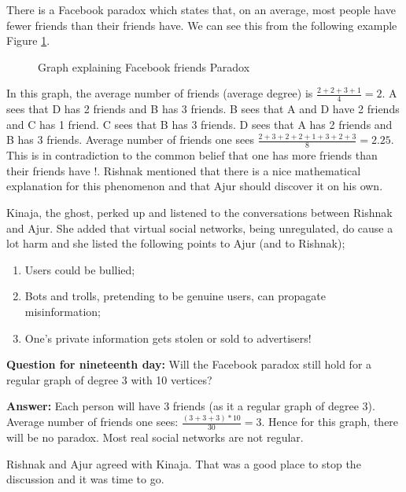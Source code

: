  There is a Facebook paradox which states that, on an average, most people have fewer friends than their friends have. We can see this from the following example Figure \ref{21g1}.
 \begin{figure}
\begin{center}
\caption{ Graph explaining Facebook friends Paradox}\label{21g1}
\end{center}
\end{figure}

In this graph, the average number of friends (average degree) is $\frac{2+2+3+1}{4}=2$.  A sees that D has 2 friends and B has 3 friends. B sees that A and D have 2 friends and C has 1 friend. C sees that B has 3 friends. D sees that A has 2 friends and B has 3 friends. Average number of friends one sees 
$\frac{2+3+2+2+1+3+2+3}{8}=2.25$. This is in contradiction to the common belief that one has more friends than their friends have !. Rishnak mentioned that there is a nice mathematical explanation for this phenomenon and that Ajur should discover it on his own.

Kinaja, the ghost, perked up and listened to the conversations between Rishnak and Ajur. She added that virtual social networks, being unregulated, do cause a lot harm and she listed the following points to Ajur (and to Rishnak);
\begin{enumerate}
    \item Users could be bullied;
    \item  Bots and trolls, pretending to be genuine users,  can propagate misinformation;
    \item  One's private information gets stolen or sold to advertisers!
\end{enumerate}


\textbf{Question for nineteenth day:} Will the Facebook paradox still hold for a regular graph of degree 3 with 10 vertices?

\textbf{Answer:} Each person will have 3 friends (as it a regular graph of degree 3).  Average number of friends one sees: $\frac{(3+3+3)*10}{30}=3$. Hence for this graph, there will be no paradox. Most real social networks are not regular.

Rishnak and Ajur agreed with Kinaja. That was a good place to stop the discussion and it was time to go.